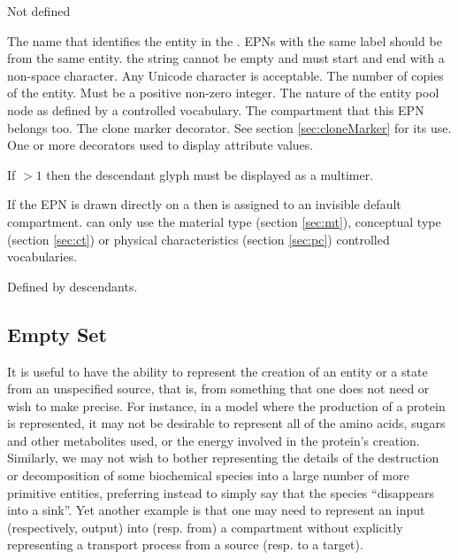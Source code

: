 \begin{glyphDescription}
\glyphSboTerm Not defined
\begin{glyphIdentity}
   The name that identifies the entity in the
  \PDm. EPNs with the same label should be from the same entity. the
  string cannot be empty and must start and end with a non-space
  character. Any Unicode character is acceptable.
   The number of copies of the entity. Must
  be a positive non-zero integer.
   The nature of the entity pool node as defined
  by a controlled vocabulary.
   The compartment
  that this EPN belongs too.
   The clone marker
  decorator. See section \ref{sec:cloneMarker} for its use.
  One or
 more decorators used to display attribute values.
\end{glyphIdentity}
\glyphAux {}
\glyphRules%
\begin{inparaenum}
\item If  $>1$ then the descendant glyph must be displayed
  as a multimer.
\item If the EPN is drawn directly on a  then
  is assigned to an invisible default
 compartment.
  can only use the material type (section
 \ref{sec:mt}), conceptual type (section \ref{sec:ct}) or physical
 characteristics (section \ref{sec:pc}) controlled vocabularies.
\end{inparaenum}
\glyphCloning Defined by descendants.
\end{glyphDescription}

\subsection{Empty Set}
\label{sec:sourceSink}

It is useful to have the ability to represent the creation of an entity or
a state from an unspecified source, that is, from something that one does
not need or wish to make precise.  For instance, in a model where the
production of a protein is represented, it may not be desirable to
represent all of the amino acids, sugars and other metabolites used, or the
energy involved in the protein's creation.  Similarly, we may not wish to
bother representing the details of the destruction or decomposition of some
biochemical species into a large number of more primitive entities,
preferring instead to simply say that the species ``disappears into a
sink''.  Yet another example is that one may need to represent an input
(respectively, output) into (resp. from) a compartment without explicitly
representing a transport process from a source (resp. to a target).



